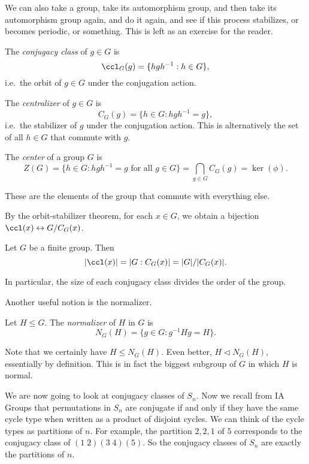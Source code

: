 \documentclass[a4paper]{article}
\begin{document}
We can also take a group, take its automorphism group, and then take its automorphism group again, and do it again, and see if this process stabilizes, or becomes periodic, or something. This is left as an exercise for the reader.

\begin{defi}
  The \emph{conjugacy class} of $g \in G$ is
  \[
    \ccl_G(g) = \{hgh^{-1}: h \in G\},
  \]
  i.e.\ the orbit of $g \in G$ under the conjugation action.
\end{defi}

\begin{defi}[Centralizer]
  The \emph{centralizer} of $g \in G$ is
  \[
    C_G(g) = \{h \in G: hgh^{-1} = g\},
  \]
  i.e.\ the stabilizer of $g$ under the conjugation action. This is alternatively the set of all $h \in G$ that commute with $g$.
\end{defi}

\begin{defi}[Center]
  The \emph{center} of a group $G$ is
  \[
    Z(G) = \{h \in G: hg h^{-1} = g\text{ for all }g \in G\} = \bigcap_{g \in G} C_G(g) = \ker (\phi).
  \]
\end{defi}
These are the elements of the group that commute with everything else.

By the orbit-stabilizer theorem, for each $x \in G$, we obtain a bijection $\ccl(x) \leftrightarrow G/C_G(x)$.
\begin{prop}
  Let $G$ be a finite group. Then
  \[
    |\ccl(x)| = |G:C_G(x)| = |G|/|C_G(x)|.
  \]
\end{prop}
In particular, the size of each conjugacy class divides the order of the group.

Another useful notion is the normalizer.
\begin{defi}[Normalizer]
  Let $H \leq G$. The \emph{normalizer} of $H$ in $G$ is
  \[
    N_G(H) = \{g \in G: g^{-1}H g = H\}.
  \]
\end{defi}
Note that we certainly have $H \leq N_G(H)$. Even better, $H \lhd N_G(H)$, essentially by definition. This is in fact the biggest subgroup of $G$ in which $H$ is normal.

We are now going to look at conjugacy classes of $S_n$. Now we recall from IA Groups that permutations in $S_n$ are conjugate if and only if they have the same cycle type when written as a product of disjoint cycles. We can think of the cycle types as partitions of $n$. For example, the partition $2, 2, 1$ of $5$ corresponds to the conjugacy class of $(1\; 2)(3\; 4)(5)$. So the conjugacy classes of $S_n$ are exactly the partitions of $n$.
\end{document}
